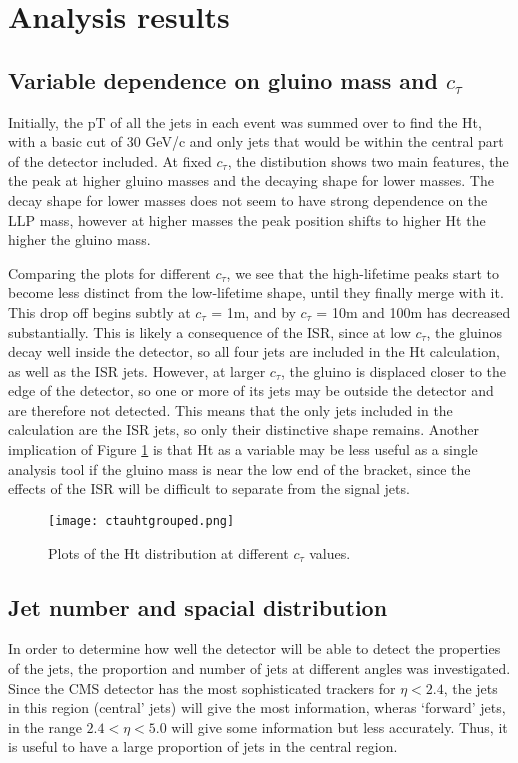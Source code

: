 \documentclass{article}
\begin{document}
\section*{Analysis results}
\subsection*{Variable dependence on gluino mass and $c_{\tau}$}
Initially, the pT of all the jets in each event was summed over to find the Ht, with a basic cut of 30 GeV/c and only jets that would be within the central part of the detector included. At fixed $c_{\tau}$, the distibution shows two main features, the the peak at higher gluino masses and the decaying shape for lower masses. The decay shape for lower masses does not seem to have strong dependence on the LLP mass, however at higher masses the peak position shifts to higher Ht the higher the gluino mass. 

Comparing the plots for different $c_{\tau}$, we see that the high-lifetime peaks start to become less distinct from the low-lifetime shape, until they finally merge with it. This drop off begins subtly at $c_{\tau}$ = 1m, and by $c_{\tau}$ = 10m and 100m has decreased substantially. This is likely a consequence of the ISR, since at low $c_{\tau}$, the gluinos decay well inside the detector, so all four jets are included in the Ht calculation, as well as the ISR jets. However, at larger $c_{\tau}$, the gluino is displaced closer to the edge of the detector, so one or more of its jets may be outside the detector and are therefore not detected. This means that the only jets included in the calculation are the ISR jets, so only their distinctive shape remains. Another implication of Figure \ref{htctau} is that Ht as a variable may be less useful as a single analysis tool if the gluino mass is near the low end of the bracket, since the effects of the ISR will be difficult to separate from the signal jets. 

\begin{figure}[H]
\centering
\texttt{[image: ctauhtgrouped.png]}
\caption{Plots of the Ht distribution at different $c_{\tau}$ values.}
	\label{htctau}
\end{figure}

\subsection*{Jet number and spacial distribution}

In order to determine how well the detector will be able to detect the properties of the jets, the proportion and number of jets at different angles was investigated. Since the CMS detector has the most sophisticated trackers for $\eta < 2.4$, the jets in this region (central' jets) will give the most information, wheras `forward' jets, in the range $2.4< \eta <5.0$ will give some information but less accurately. Thus, it is useful to have a large proportion of jets in the central region. 
\end{document}
